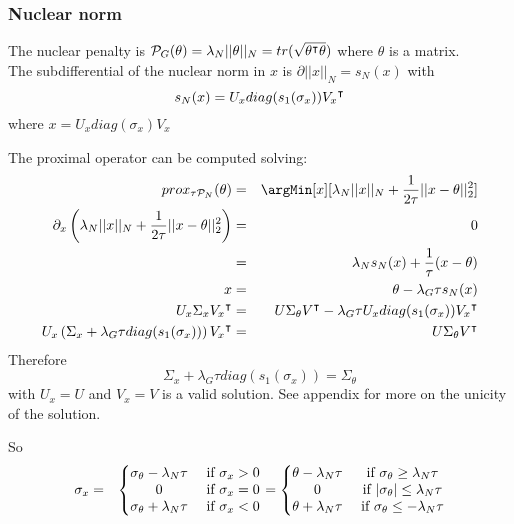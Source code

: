 \documentclass{article}
\begin{document}
\subsubsection{Nuclear norm}
\label{sec:orga180bfc}
The nuclear penalty is $\mathcal{P}_G(\theta)=\lambda_N||\theta||_N = tr(\sqrt{{\theta}^\intercal\theta})$ where $\theta$ is a matrix. \\
The subdifferential of the nuclear norm in \(x\) is \(\partial ||x||_N = s_N(x) \) with
\[ s_N(x) = U_x diag(s_1(\sigma_x)) {V_x}^\intercal  \]
where \(x = U_x diag(\sigma_x) V_x\)


The proximal operator can be computed solving:
\begin{eqnarray*}
prox_{\tau \mathcal{P}_N}(\theta) &=& \argMin[x][\lambda_N||x||_N+\frac{1}{2\tau} ||x-\theta||_2^2] \\
\partial_x\left(\lambda_N||x||_N+\frac{1}{2 \tau} ||x-\theta||_2^2 \right) 
       &=& 0 \\
       &=& \lambda_N s_N(x) +\frac{1}{\tau} (x-\theta) \\
     x &=& \theta - \lambda_G \tau s_N(x) \\
    U_x \Sigma_x \trans{V_x} &=& U \Sigma_\theta \trans{V} - \lambda_G \tau U_x diag(s_1(\sigma_x)) \trans{V_x} \\
    U_x \left( \Sigma_x + \lambda_G \tau diag(s_1(\sigma_x)) \right) \trans{V_x} &=& U \Sigma_\theta \trans{V} \\
\end{eqnarray*} 
Therefore 
\[\Sigma_x + \lambda_G \tau diag(s_1(\sigma_x)) = \Sigma_\theta\]
with \(U_x = U\) and \(V_x = V\) is a valid solution. See appendix for more on the unicity of the solution.

So \begin{eqnarray}
\sigma_x &=& \left\{ \begin{matrix}
\sigma_\theta - \lambda_N \tau &\text{ if } \sigma_x>0  \\
0 & \text{ if } \sigma_x=0  \\
\sigma_\theta + \lambda_N \tau &\text{ if } \sigma_x<0  \\
\end{matrix}  \right. 
= \left\{ \begin{matrix}
\theta - \lambda_N \tau &\text{ if } \sigma_\theta\geq\lambda_N\tau  \\
0 & \text{ if } |\sigma_\theta|\leq\lambda_N\tau  \\
\theta + \lambda_N \tau &\text{ if } \sigma_\theta\leq-\lambda_N\tau  \\
\end{matrix}  \right. \notag 
\end{eqnarray}
		
\end{document}
